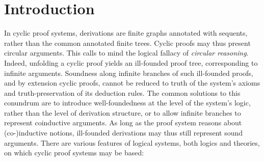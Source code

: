 
\chapter{Introduction}
\label{chap:intro}

In cyclic proof systems, derivations are finite graphs annotated with sequents,
rather than the common annotated finite trees. Cyclic proofs may thus present
circular arguments.
This calls to mind the logical fallacy of \emph{circular reasoning}.
Indeed, unfolding a cyclic proof yields an ill-founded proof tree, corresponding
to infinite arguments.
Soundness along infinite branches of such ill-founded proofs,
and by extension cyclic proofs, cannot be reduced to truth of the system's
axioms and truth-preservation of its deduction rules.
The common solutions to this conundrum are to introduce well-foundedness at the
level of the system's logic, rather than the level of derivation structure, or
to allow infinite branches to represent coinductive arguments.
As long as the proof system reasons about (co-)inductive notions, ill-founded
derivations may thus still represent sound arguments. There are various features
of logical systems, both logics and theories, on which
cyclic proof systems may be based:
